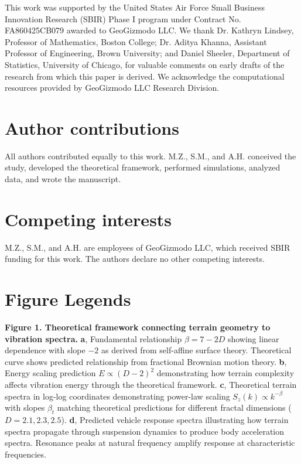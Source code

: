 \documentclass[11pt]{article}
\begin{document}
This work was supported by the United States Air Force Small Business Innovation Research (SBIR) Phase I program under Contract No. FA860425CB079 awarded to GeoGizmodo LLC. We thank Dr. Kathryn Lindsey, Professor of Mathematics, Boston College; Dr. Aditya Khanna, Assistant Professor of Engineering, Brown University; and Daniel Sheeler, Department of Statistics, University of Chicago, for valuable comments on early drafts of the research from which this paper is derived. We acknowledge the computational resources provided by GeoGizmodo LLC Research Division.

\section*{Author contributions}

All authors contributed equally to this work. M.Z., S.M., and A.H. conceived the study, developed the theoretical framework, performed simulations, analyzed data, and wrote the manuscript.

\section*{Competing interests}

M.Z., S.M., and A.H. are employees of GeoGizmodo LLC, which received SBIR funding for this work. The authors declare no other competing interests.


\section*{Figure Legends}

\textbf{Figure 1. Theoretical framework connecting terrain geometry to vibration spectra.} 
\textbf{a}, Fundamental relationship $\beta = 7-2D$ showing linear dependence with slope $-2$ as derived from self-affine surface theory. Theoretical curve shows predicted relationship from fractional Brownian motion theory. 
\textbf{b}, Energy scaling prediction $E \propto (D-2)^2$ demonstrating how terrain complexity affects vibration energy through the theoretical framework.
\textbf{c}, Theoretical terrain spectra in log-log coordinates demonstrating power-law scaling $S_z(k) \propto k^{-\beta}$ with slopes $\beta_t$ matching theoretical predictions for different fractal dimensions ($D = 2.1, 2.3, 2.5$).
\textbf{d}, Predicted vehicle response spectra illustrating how terrain spectra propagate through suspension dynamics to produce body acceleration spectra. Resonance peaks at natural frequency amplify response at characteristic frequencies.
\end{document}

